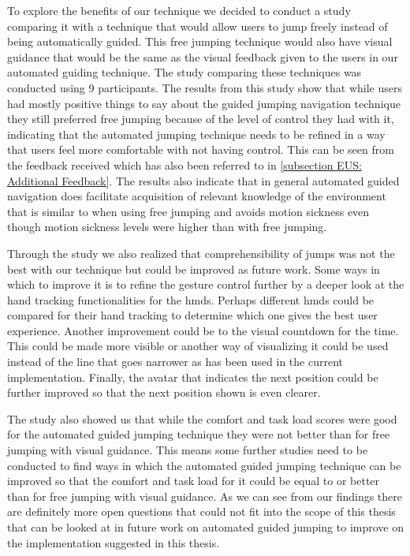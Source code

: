To explore the benefits of our technique we decided to conduct a study comparing it with a technique that would allow users to jump freely instead of being automatically guided. This free jumping technique would also have visual guidance that would be the same as the visual feedback given to the users in our automated guiding technique. The study comparing these techniques was conducted using 9 participants. The results from this study show that while users had mostly positive things to say about the guided jumping navigation technique they still preferred free jumping because of the level of control they had with it, indicating that the automated jumping technique needs to be refined in a way that users feel more comfortable with not having control. This can be seen from the feedback received which has also been referred to in \cref{subsection EUS: Additional Feedback}. The results also indicate that in general automated guided navigation does facilitate acquisition of relevant knowledge of the environment that is similar to when using free jumping and avoids motion sickness even though motion sickness levels were higher than with free jumping. 

Through the study we also realized that comprehensibility of jumps was not the best with our technique but could be improved as future work. Some ways in which to improve it is to refine the gesture control further by a deeper look at the hand tracking functionalities for the \acrshort{hmd}s. Perhaps different \acrshort{hmd}s could be compared for their hand tracking to determine which one gives the best user experience. Another improvement could be to the visual countdown for the time. This could be made more visible or another way of visualizing it could be used instead of the line that goes narrower as has been used in the current implementation. Finally, the avatar that indicates the next position could be further improved so that the next position shown is even clearer. 

The study also showed us that while the comfort and task load scores were good for the automated guided jumping technique they were not better than for free jumping with visual guidance. This means some further studies need to be conducted to find ways in which the automated guided jumping technique can be improved so that the comfort and task load for it could be equal to or better than for free jumping with visual guidance.  As we can see from our findings there are definitely more open questions that could not fit into the scope of this thesis that can be looked at in future work on automated guided jumping to improve on the implementation suggested in this thesis.

